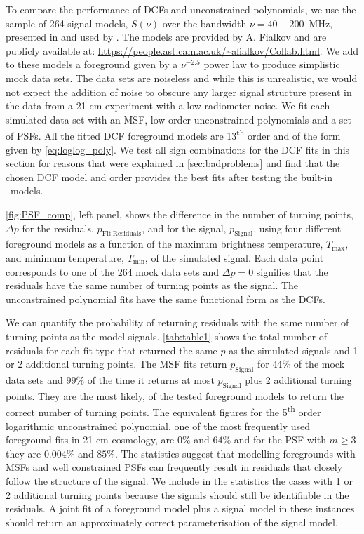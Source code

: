 To compare the performance of DCFs and unconstrained polynomials, we use the sample of 264 signal models, $S(\nu)$ over the bandwidth $\nu = 40 - 200$~MHz, presented in \cite{Cohen_global_2017} and used by \cite{Singh_saras2_2018}. The models are provided by A. Fialkov and are publicly available at: \url{https://people.ast.cam.ac.uk/~afialkov/Collab.html}. We add to these models a foreground given by a $\nu^{-2.5}$ power law to produce simplistic mock data sets. The data sets are noiseless and while this is unrealistic, we would not expect the addition of noise to obscure any larger signal structure present in the data from a 21-cm experiment with a low radiometer noise. We fit each simulated data set with an MSF, low order unconstrained polynomials and a set of PSFs. All the fitted DCF foreground models are 13\textsuperscript{th} order and of the form given by \cref{eq:loglog_poly}. We test all sign combinations for the DCF fits in this section for reasons that were explained in \cref{sec:badproblems} and find that the chosen DCF model and order provides the best fits after testing the built-in \maxsmooth~models.

\cref{fig:PSF_comp}, left panel, shows the difference in the number of turning points, $\Delta p$ for the residuals, $p_\mathrm{Fit~Residuals}$, and for the signal, $p_\mathrm{Signal}$, using four different foreground models as a function of the maximum brightness temperature, $T_\mathrm{max}$, and minimum temperature, $T_\mathrm{min}$, of the simulated signal. Each data point corresponds to one of the $264$ mock data sets and $\Delta p = 0$ signifies that the residuals have the same number of turning points as the signal. The unconstrained polynomial fits have the same functional form as the DCFs.

We can quantify the probability of returning residuals with the same number of turning points as the model signals. \cref{tab:table1} shows the total number of residuals for each fit type that returned the same $p$ as the simulated signals and 1 or 2 additional turning points. The MSF fits return $p_\mathrm{Signal}$ for $44\%$ of the mock data sets and $99\%$ of the time it returns at most $p_\mathrm{Signal}$ plus 2 additional turning points. They are the most likely, of the tested foreground models to return the correct number of turning points. The equivalent figures for the 5\textsuperscript{th} order logarithmic unconstrained polynomial, one of the most frequently used foreground fits in 21-cm cosmology, are $0\%$ and $64\%$ and for the PSF with $m \geq 3$ they are $0.004\%$ and $85\%$. The statistics suggest that modelling foregrounds with MSFs and well constrained PSFs can frequently result in residuals that closely follow the structure of the signal. We include in the statistics the cases with 1 or 2 additional turning points because the signals should still be identifiable in the residuals. A joint fit of a foreground model plus a signal model in these instances should return an approximately correct parameterisation of the signal model.

